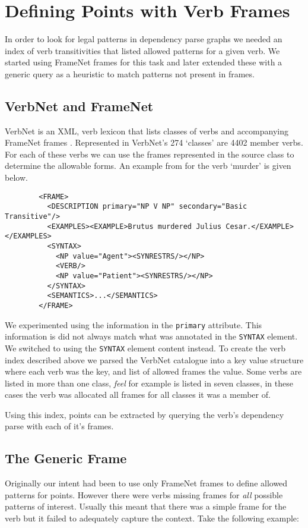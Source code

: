   \section{Defining Points with Verb Frames}
    In order to look for legal patterns in dependency parse graphs we needed an index of verb transitivities that listed allowed patterns for a given verb. We started using FrameNet frames for this task and later extended these with a generic query as a heuristic to match patterns not present in frames.
    \tocless\subsection{VerbNet and FrameNet}
      VerbNet is an XML, verb lexicon that lists classes of verbs and accompanying FrameNet frames \cite{schuler2005verbnet,fillmore2002framenet}. Represented in VerbNet's 274 `classes' are 4402 member verbs. For each of these verbs we can use the frames represented in the source class to determine the allowable forms. An example from for the verb `murder' is given below.

      \lstset{language=XML}
      \begin{lstlisting}
        <FRAME>
          <DESCRIPTION primary="NP V NP" secondary="Basic Transitive"/>
          <EXAMPLES><EXAMPLE>Brutus murdered Julius Cesar.</EXAMPLE></EXAMPLES>
          <SYNTAX>
            <NP value="Agent"><SYNRESTRS/></NP>
            <VERB/>
            <NP value="Patient"><SYNRESTRS/></NP>
          </SYNTAX>
          <SEMANTICS>...</SEMANTICS>
        </FRAME>
      \end{lstlisting}

      We experimented using the information in the \texttt{primary} attribute. This information is did not always match what was annotated in the \texttt{SYNTAX} element. We switched to using the \texttt{SYNTAX} element content instead. To create the verb index described above we parsed the VerbNet catalogue into a key value structure where each verb was the key, and list of allowed frames the value. Some verbs are listed in more than one class, \textit{feel} for example is listed in seven classes, in these cases the verb was allocated all frames for all classes it was a member of.

      Using this index, points can be extracted by querying the verb's dependency parse with each of it's frames.

    \tocless\subsection{The Generic Frame}
      Originally our intent had been to use only FrameNet frames to define allowed patterns for points. However there were verbs missing frames for \textit{all} possible patterns of interest. Usually this meant that there was a simple frame for the verb but it failed to adequately capture the context. Take the following example:

